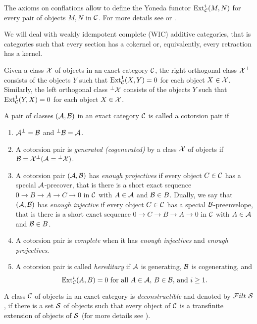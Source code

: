 The axioms on conflations allow to define the Yoneda functor $\operatorname{Ext}^i_{\mathcal{C}}(M,N)$ for every pair of objects $M,N$
 in $\mathcal{C}$.
For more details see \cite{Kel90} or \cite{Bu}.

We will deal with weakly idempotent complete (WIC) additive categories, that is categories such that every section has a cokernel or, equivalently, every retraction has a kernel.

\begin{sloppypar}
  Given a class $\mathcal{X}$ of objects in an exact category $\mathcal{C}$, the right orthogonal class $\mathcal{X}^{\perp}$ consists of the objects $Y$ such that ${\operatorname{Ext}^1_{\mathcal{C}}(X,Y)=0}$ for each object $X\in \mathcal{X}$. Similarly, the left orthogonal class $^{\perp}\mathcal{X} $ consists of the objects $Y$ such that $\operatorname{Ext}^1_{\mathcal{C}}(Y,X)=0$ for each object $X\in \mathcal{X}$.
\end{sloppypar}

\begin{defn}\label{D:cotorsion-pair} A pair of classes $(\mathcal{A}, \mathcal{B})$ in an exact category $\mathcal{C}$ is called a cotorsion pair if
\begin{enumerate}
\item $\mathcal{A}^{\perp}=\mathcal{B}$ and $^{\perp} \mathcal{B}=\mathcal{A}$.
\item A cotorsion pair is \emph{generated (cogenerated)} by a class $\mathcal{X}$ of objects if $\mathcal{B}=\mathcal{X}^{\perp} (\mathcal{A}={^{\perp}\mathcal{X}})$.
\item A cotorsion pair $(\mathcal{A}, \mathcal{B})$ has \emph{enough projectives} if every object $C\in \mathcal{C}$ has a special $\mathcal{A}$-precover, that is there is a short exact sequence $0\to B\to A\to C\to 0$ in $\mathcal{C}$ with $A\in \mathcal{A}$ and $\mathcal{B}\in B$. Dually, we say that  $(\mathcal{A}, \mathcal{B})$ has \emph{enough injective} if every object $C\in \mathcal{C}$ has a special $\mathcal{B}$-preenvelope, that is there is a short exact sequence $0\to C\to B\to A\to 0$ in $\mathcal{C}$ with $A\in \mathcal{A}$ and $\mathcal{B}\in B$.
\item A cotorsion pair is \emph{complete} when it has \emph{enough injectives} and \emph{enough projectives}.
\item A cotorsion pair is called \emph{hereditary} if $\mathcal{A}$ is generating, $\mathcal{B}$ is cogenerating, and
  \[ \operatorname{Ext}^i_{\mathcal{C}}(A,B)=0 \text{ for all }A\in \mathcal{A}\text{, }B\in \mathcal{B}\text{, and } i\geq 1. \]
\end{enumerate}
\end{defn}
A class $\mathcal{C}$ of objects in an exact category is \emph{deconstructible} and denoted by $\mathcal{F} ilt\ \mathcal{S}$, if there is a set $\mathcal{S}$ of objects such that every object of $\mathcal{C}$ is a transfinite extension of objects of $\mathcal{S}$ (for more details see \cite[Definition 3.7 and 3.10]{Sto13}).

